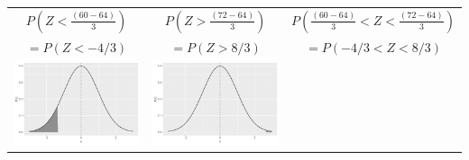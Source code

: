\begin{frame}
\end{frame}

\begin{frame}

  \begin{block}{\examplectd}
    \begin{center}
    \begin{tabular}{ccc}
    $P\left(Z < \frac{(60-64)}{3}\right)$
    & $P\left(Z > \frac{(72-64)}{3}\right)$
    & $P\left(\frac{(60-64)}{3} < Z < \frac{(72-64)}{3}\right)$\\
    $=P(Z < -4/3)$ & 
    $=P(Z > 8/3)$ &
    $=P(-4/3 < Z < 8/3)$\\
    \includegraphics[height = .35\textheight]{figure/exercise-20-6}
    &
    \includegraphics[height = .35\textheight]{figure/exercise-20-7}
    &

\end{tabular}
\end{center}
\end{block}
\end{frame}
